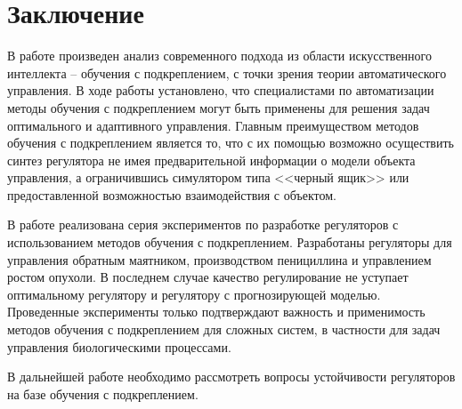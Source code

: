 \chapter*{Заключение} \label{ch-conclusion}

В работе произведен анализ современного подхода из области искусственного интеллекта -- обучения с подкреплением, с точки зрения теории автоматического управления. 
В ходе работы установлено, что специалистами по автоматизации методы обучения с подкреплением могут быть применены для решения задач оптимального и адаптивного управления. Главным преимуществом методов обучения с подкреплением является то, что с их помощью возможно осуществить синтез регулятора не имея предварительной информации о модели объекта управления, а ограничившись симулятором типа <<черный ящик>> или предоставленной возможностью взаимодействия с объектом.

В работе реализована серия экспериментов по разработке регуляторов с использованием методов обучения с подкреплением. Разработаны регуляторы для управления обратным маятником, производством пенициллина и управлением ростом опухоли. В последнем случае качество регулирование не уступает оптимальному регулятору и регулятору с прогнозирующей моделью. Проведенные эксперименты только подтверждают важность и применимость методов обучения с подкреплением для сложных систем, в частности для задач управления биологическими процессами. 

В дальнейшей работе необходимо рассмотреть вопросы устойчивости регуляторов на базе обучения с подкреплением.